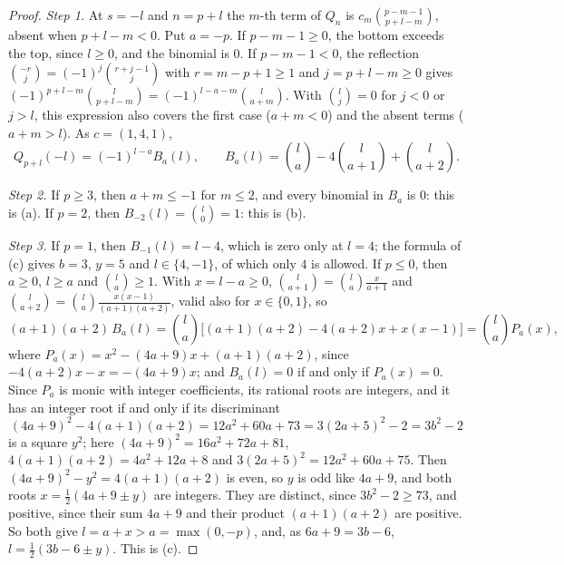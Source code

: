 \documentclass[11pt]{article}
\begin{document}
\begin{proof}
\emph{Step 1.} At $s=-l$ and $n=p+l$ the $m$-th term of $Q_n$ is $c_m\binom{p-m-1}{p+l-m}$, absent when $p+l-m<0$. Put $a=-p$. If $p-m-1\ge0$, the bottom exceeds the top, since $l\ge0$, and the binomial is $0$. If $p-m-1<0$, the reflection $\binom{-r}{j}=(-1)^j\binom{r+j-1}{j}$ with $r=m-p+1\ge1$ and $j=p+l-m\ge0$ gives $(-1)^{p+l-m}\binom{l}{p+l-m}=(-1)^{l-a-m}\binom{l}{a+m}$. With $\binom{l}{j}=0$ for $j<0$ or $j>l$, this expression also covers the first case ($a+m<0$) and the absent terms ($a+m>l$). As $c=(1,4,1)$,
\[
Q_{p+l}(-l)=(-1)^{l-a}B_a(l),\qquad B_a(l)=\binom{l}{a}-4\binom{l}{a+1}+\binom{l}{a+2}.\tag{V}
\]

\emph{Step 2.} If $p\ge3$, then $a+m\le-1$ for $m\le2$, and every binomial in $B_a$ is $0$: this is (a). If $p=2$, then $B_{-2}(l)=\binom{l}{0}=1$: this is (b).

\emph{Step 3.} If $p=1$, then $B_{-1}(l)=l-4$, which is zero only at $l=4$; the formula of (c) gives $b=3$, $y=5$ and $l\in\{4,-1\}$, of which only $4$ is allowed. If $p\le0$, then $a\ge0$, $l\ge a$ and $\binom{l}{a}\ge1$. With $x=l-a\ge0$, $\binom{l}{a+1}=\binom{l}{a}\frac{x}{a+1}$ and $\binom{l}{a+2}=\binom{l}{a}\frac{x(x-1)}{(a+1)(a+2)}$, valid also for $x\in\{0,1\}$, so
\[
(a+1)(a+2)\,B_a(l)=\binom{l}{a}\bigl[(a+1)(a+2)-4(a+2)x+x(x-1)\bigr]=\binom{l}{a}P_a(x),
\]
where $P_a(x)=x^2-(4a+9)x+(a+1)(a+2)$, since $-4(a+2)x-x=-(4a+9)x$; and $B_a(l)=0$ if and only if $P_a(x)=0$. Since $P_a$ is monic with integer coefficients, its rational roots are integers, and it has an integer root if and only if its discriminant
\[
(4a+9)^2-4(a+1)(a+2)=12a^2+60a+73=3(2a+5)^2-2=3b^2-2
\]
is a square $y^2$; here $(4a+9)^2=16a^2+72a+81$, $4(a+1)(a+2)=4a^2+12a+8$ and $3(2a+5)^2=12a^2+60a+75$. Then $(4a+9)^2-y^2=4(a+1)(a+2)$ is even, so $y$ is odd like $4a+9$, and both roots $x=\frac12(4a+9\pm y)$ are integers. They are distinct, since $3b^2-2\ge73$, and positive, since their sum $4a+9$ and their product $(a+1)(a+2)$ are positive. So both give $l=a+x>a=\max(0,-p)$, and, as $6a+9=3b-6$, $l=\frac12(3b-6\pm y)$. This is (c).


\end{proof}
\end{document}
